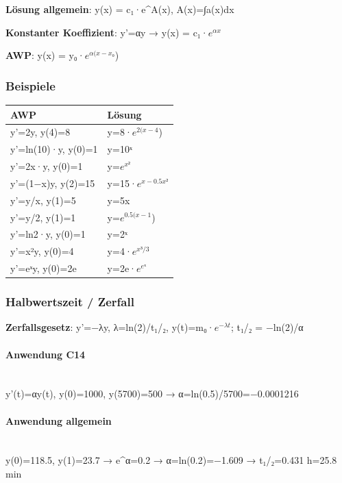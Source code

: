 \documentclass[11pt, a4paper]{article}
\begin{document}
\textbf{Lösung allgemein}: y(x) = c₁·e\textasciicircum{}A(x), A(x)=∫a(x)dx

\textbf{Konstanter Koeffizient}: y'=αy → y(x) = c₁·$e^{αx}$

\textbf{AWP}: y(x) = y₀·$e^{α(x−x₀}$)



\subsubsection{Beispiele}

{\small
\begin{tabularx}{\linewidth}{XX}
\hline
\rowcolor{tableheadbg}
{\color{white}\textbf{AWP}} & {\color{white}\textbf{Lösung}} \\[2pt]
\hline
\endhead
\hline
\endfoot
y'=2y, y(4)=8 & y=8·$e^{2(x−4}$) \\
y'=ln(10)·y, y(0)=1 & y=10ˣ \\
y'=2x·y, y(0)=1 & y=$e^{x²}$ \\
y'=(1−x)y, y(2)=15 & y=15·$e^{x−0.5x²}$ \\
y'=y/x, y(1)=5 & y=5x \\
y'=y/2, y(1)=1 & y=$e^{0.5(x−1}$) \\
y'=ln2·y, y(0)=1 & y=2ˣ \\
y'=x²y, y(0)=4 & y=4·$e^{x³/3}$ \\
y'=eˣy, y(0)=2e & y=2e·$e^{eˣ}$ \\
\end{tabularx}
}



\subsubsection{Halbwertszeit / Zerfall}
\textbf{Zerfallsgesetz}: y'=−λy, λ=ln(2)/t₁/₂, y(t)=m₀·$e^{−λt}$; t₁/₂ = −ln(2)/α


\paragraph{Anwendung C14}\mbox{}\\[2pt]
y'(t)=αy(t), y(0)=1000, y(5700)=500 → α=ln(0.5)/5700=−0.0001216


\paragraph{Anwendung allgemein}\mbox{}\\[2pt]
y(0)=118.5, y(1)=23.7 → e\textasciicircum{}α=0.2 → α=ln(0.2)=−1.609 → t₁/₂=0.431 h=25.8 min
\end{document}
